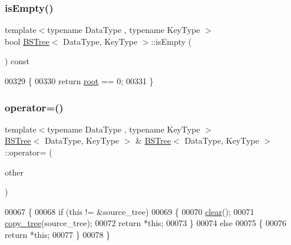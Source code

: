 \subsubsection{\texorpdfstring{is\+Empty()}{isEmpty()}}
{\footnotesize\ttfamily template$<$typename Data\+Type , typename Key\+Type $>$ \\
bool \hyperlink{class_b_s_tree}{B\+S\+Tree}$<$ Data\+Type, Key\+Type $>$\+::is\+Empty (\begin{DoxyParamCaption}{ }\end{DoxyParamCaption}) const}


\begin{DoxyCode}
00329 \{
00330     \textcolor{keywordflow}{return} \hyperlink{class_b_s_tree_a83534afce9094181ac031f9f596a8625}{root} == 0;
00331 \}
\end{DoxyCode}
\hypertarget{class_b_s_tree_ac36b0b564aa3c411c239d730f506f448}{}\label{class_b_s_tree_ac36b0b564aa3c411c239d730f506f448} 
\subsubsection{\texorpdfstring{operator=()}{operator=()}}
{\footnotesize\ttfamily template$<$typename Data\+Type , typename Key\+Type $>$ \\
\hyperlink{class_b_s_tree}{B\+S\+Tree}$<$ Data\+Type, Key\+Type $>$ \& \hyperlink{class_b_s_tree}{B\+S\+Tree}$<$ Data\+Type, Key\+Type $>$\+::operator= (\begin{DoxyParamCaption}\item[{const \hyperlink{class_b_s_tree}{B\+S\+Tree}$<$ Data\+Type, Key\+Type $>$ \&}]{other }\end{DoxyParamCaption})}


\begin{DoxyCode}
00067 \{
00068     \textcolor{keywordflow}{if} (\textcolor{keyword}{this} != &source\_tree)
00069     \{
00070         \hyperlink{class_b_s_tree_a926822d08f3d0321603f9fafd2254b16}{clear}();
00071         \hyperlink{class_b_s_tree_a7423df4da3dd2035e681a67c321ec719}{copy\_tree}(source\_tree);
00072         \textcolor{keywordflow}{return} *\textcolor{keyword}{this};
00073     \}
00074     \textcolor{keywordflow}{else}
00075     \{
00076         \textcolor{keywordflow}{return} *\textcolor{keyword}{this};
00077     \}
00078 \}
\end{DoxyCode}
\hypertarget{class_b_s_tree_a7750c081fd047304b6ded5f2df65b3f3}{}\label{class_b_s_tree_a7750c081fd047304b6ded5f2df65b3f3} 
